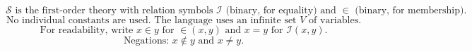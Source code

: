 $$
\mathcal{S} \text{ is the first-order theory with relation symbols } \mathcal{I} \text{ (binary, for equality) and } \in \text{ (binary, for membership).}
$$
$$
\text{No individual constants are used. The language uses an infinite set } V \text{ of variables.}
$$
$$
\text{For readability, write } x \in y \text{ for } {\in}(x, y) \text{ and } x = y \text{ for } \mathcal{I}(x, y).
$$
$$
\text{Negations: } x \notin y \text{ and } x \neq y.
$$
